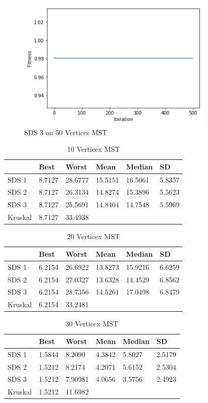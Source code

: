\documentclass{AISB2008}
\begin{document}
{\begin{figure}
\centerline{\includegraphics[height=2.5in]{50MSTA3.png}}
\caption{SDS 3 on 50 Vertices MST}
\end{figure}


\begin{table}
\centering
\caption{10 Verticex MST}
\begin{tabular}{l|lllll}
	   & Best    & Worst    &   Mean  & Median & SD \\ \hline
SDS 1  & 8.7127 & 28.6777 & 15.5151 & 16.5061 & 5.8357 \\
SDS 2  & 8.7127 & 26.3134 & 14.8274 & 15.3896 & 5.5623	\\
SDS 3  & 8.7127 & 25.5691 & 14.8404	& 14.7548 & 5.5969 \\
Kruskal &8.7127 & 33.4938 & 		&  & \\
\end{tabular}
\end{table}

\begin{table}
\centering
\caption{20 Verticex MST}
\begin{tabular}{l|lllll}
	   & Best    & Worst    &   Mean  & Median & SD \\ \hline
SDS 1  & 6.2154 & 26.6922 & 13.8273 & 15.9216	 & 6.6259	 \\
SDS 2  & 6.2154 & 27.0327 & 13.6328	 & 14.4529	 & 6.8562	\\
SDS 3  & 6.2154 & 28.7356	 & 14.5261	& 17.0498	 & 6.8479 \\
Kruskal &6.2154 & 33.2481 & 		&  & \\
\end{tabular}
\end{table}

\begin{table}
\centering
\caption{30 Verticex MST}
\begin{tabular}{l|lllll}
	   & Best    & Worst    &   Mean  & Median & SD \\ \hline
SDS 1  & 1.5844	&  8.2090 & 4.3842  & 5.8027 & 2.5179 \\
SDS 2  & 1.5212 & 8.2174 & 4.2071 & 5.6152 & 2.5304 \\
SDS 3  & 1.5212 & 7.90981 & 4.0656	& 3.5756 & 2.4923 \\
Kruskal &1.5212 & 11.6982 & 		&  & \\
\end{tabular}
\end{table}

}
\end{document}
